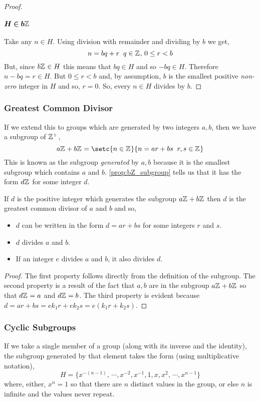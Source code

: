 \documentclass[MathsNotesBase.tex]{subfiles}
\begin{document}
{\begin{proof}
			\paragraph{$\bm{H \in b\mathbb{Z}^{}}$}
			Take any $n \in H$. Using division with remainder and dividing by $b$ we get,
			\[ n = bq + r \;\; q \in \mathbb{Z}^{},\, 0 \leq r < b \]
			But, since $b\mathbb{Z}^{} \in H$ this means that $bq \in H$ and so $-bq \in H$. Therefore $n - bq = r \in H$. But $0 \leq r < b$ and, by assumption, $b$ is the smallest positive \textit{non-zero} integer in $H$ and so, $r = 0$. So, every $n \in H$ divides by $b$.
		\end{proof}
	
		\subsubsection{Greatest Common Divisor}
		If we extend this to groups which are generated by two integers $a,b$, then we have a subgroup of $\mathbb{Z}^{+}$,
		\[ a\Z{} + b\Z{} = \setc{n \in \Z{}}{n = ar + bs \;\; r, s \in \Z{}} \]
		This is known as the subgroup \textit{generated} by $a,b$ because it is the smallest subgroup which contains $a$ and $b$. \autoref{prop:bZ_subgroup} tells us that it has the form $d\mathbb{Z}^{}$ for some integer $d$.
		\begin{corollary}
			If $d$ is the positive integer which generates the subgroup $a\mathbb{Z}^{} + b\mathbb{Z}^{}$ then $d$ is the greatest common divisor of $a$ and $b$ and so,
			\begin{itemize}
				\item{$d$ can be written in the form $d = ar + bs$ for some integers $r$ and $s$.}
				\item{$d$ divides $a$ and $b$.}
				\item{If an integer $e$ divides $a$ and $b$, it also divides $d$.}
			\end{itemize}
		\end{corollary} 
		\begin{proof}
			The first property follows directly from the definition of the subgroup. The second property is a result of the fact that $a,b$ are in the subgroup $a\mathbb{Z}^{} + b\mathbb{Z}^{}$ so that $d\mathbb{Z}^{} = a$ and $d\mathbb{Z}^{} = b$. The third property is evident because $d = ar + bs = ek_1r + ek_2s = e(k_1r + k_2s)$.
		\end{proof}
	
		\subsubsection{Cyclic Subgroups}
		If we take a single member of a group (along with its inverse and the identity), the subgroup generated by that element takes the form (using multiplicative notation),
		\[ H = \{ x^{-(n-1)},\, \cdots , x^{-2}, x^{-1}, 1, x, x^2,\, \cdots , x^{n-1} \} \]
		where, either, $x^n = 1$ so that there are $n$ distinct values in the group, or else $n$ is infinite and the values never repeat.
		
}
\end{document}
